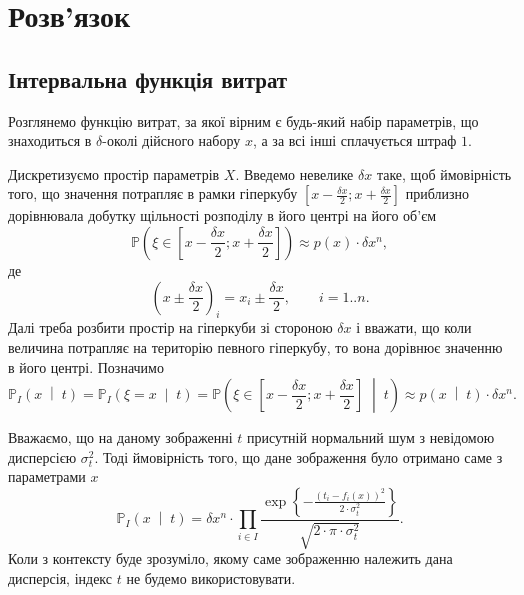 \section{Розв'язок}

\subsection{Інтервальна функція витрат}

Розглянемо функцію витрат,
за якої вірним є будь-який набір параметрів,
що знаходиться в $\delta$-околі дійсного набору $x$,
а за всі інші сплачується штраф $1$.

Дискретизуємо простір параметрів $X$.
Введемо невелике $\delta x$ таке,
щоб ймовірність того, що значення потрапляє в рамки гіперкубу
$\left[ x - \frac{\delta x}{2}; x + \frac{\delta x}{2} \right]$
приблизно дорівнювала добутку щільності розподілу в його центрі
на його об'єм
\begin{equation*}
  \mathbb{P}\left( \xi \in \left[ x - \frac{\delta x}{2};
                                  x + \frac{\delta x}{2} \right] \right)
  \approx p\left( x \right) \cdot \delta x^n,
\end{equation*}
де
\begin{equation*}
  \left( x \pm \frac{\delta x}{2} \right)_i = x_i \pm \frac{\delta x}{2},\qquad
  i = 1..n.
\end{equation*}
Далі треба розбити простір на гіперкуби
зі стороною $\delta x$ і вважати,
що коли величина потрапляє на територію певного гіперкубу,
то вона дорівнює значенню в його центрі.
Позначимо
\begin{equation*}
  \mathbb{P}_I\left( x \;\middle|\; t \right)
  = \mathbb{P}_I\left( \xi = x \;\middle|\; t \right)
  = \mathbb{P}\left( \xi \in \left[ x - \frac{\delta x}{2};
                                    x + \frac{\delta x}{2} \right]
    \;\middle|\; t \right)
  \approx p\left( x \;\middle|\; t \right) \cdot \delta x^n.
\end{equation*}

Вважаємо, що на даному зображенні $t$
присутній нормальний шум з невідомою дисперсією $\sigma^2_t$.
Тоді ймовірність того,
що дане зображення було отримано саме з параметрами $x$
\begin{equation*}
  \mathbb{P}_I\left( x \;\middle|\; t \right)
  = \delta x^n \cdot \prod_{i \in I}
    \frac{\exp{\left\{- \frac{\left( t_i - f_i\left( x \right) \right)^2}
           {2 \cdot \sigma^2_t} \right\}}}
           {\sqrt{2 \cdot \pi \cdot \sigma^2_t}}.
\end{equation*}
Коли з контексту буде зрозуміло,
якому саме зображенню належить дана дисперсія,
індекс $t$ не будемо використовувати.

